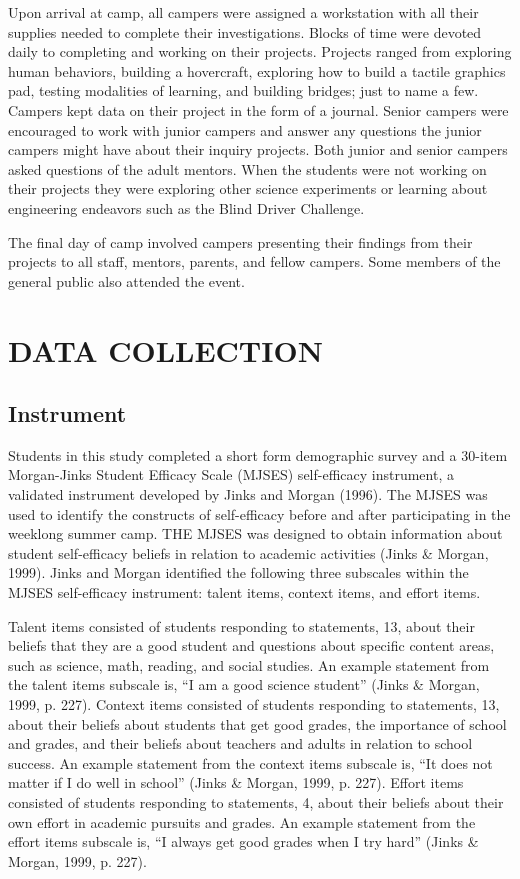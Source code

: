 \documentclass[11.5pt]{sig-alternate} %
\begin{document}
\begin{large}


Upon arrival at camp, all campers were assigned a workstation with all their supplies needed to complete their investigations. Blocks of time were devoted daily to completing and working on their projects. Projects ranged from exploring human behaviors, building a hovercraft, exploring how to build a tactile graphics pad, testing modalities of learning, and building bridges; just to name a few. Campers kept data on their project in the form of a journal. Senior campers were encouraged to work with junior campers and answer any questions the junior campers might have about their inquiry projects. Both junior and senior campers asked questions of the adult mentors. When the students were not working on their projects they were exploring other science experiments or learning about engineering endeavors such as the Blind Driver Challenge.  

The final day of camp involved campers presenting their findings from their projects to all staff, mentors, parents, and fellow campers. Some members of the general public also attended the event.  

\section*{DATA COLLECTION}

\subsection*{Instrument}

Students in this study completed a short form demographic survey and a 30-item Morgan-Jinks Student Efficacy Scale (MJSES) self-efficacy instrument, a validated instrument developed by Jinks and Morgan (1996). The MJSES was used to identify the constructs of self-efficacy before and after participating in the weeklong summer camp. THE MJSES was designed to obtain information about student self-efficacy beliefs in relation to academic activities (Jinks \& Morgan, 1999). Jinks and Morgan identified the following three subscales within the MJSES self-efficacy instrument: talent items, context items, and effort items. 

Talent items consisted of students responding to statements, 13, about their beliefs that they are a good student and questions about specific content areas, such as science, math, reading, and social studies.  An example statement from the talent items subscale is, “I am a good science student” (Jinks \& Morgan, 1999, p. 227). Context items consisted of students responding to statements, 13, about their beliefs about students that get good grades, the importance of school and grades, and their beliefs about teachers and adults in relation to school success. An example statement from the context items subscale is, “It does not matter if I do well in school” (Jinks \& Morgan, 1999, p. 227).  Effort items consisted of students responding to statements, 4, about their beliefs about their own effort in academic pursuits and grades.  An example statement from the effort items subscale is, “I always get good grades when I try hard” (Jinks \& Morgan, 1999, p. 227).


\end{large}
\end{document}
